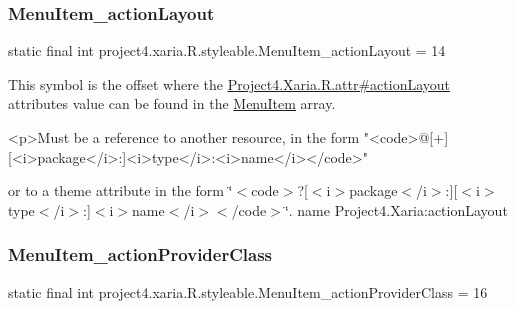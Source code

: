 \mbox{\label{classproject4_1_1xaria_1_1R_1_1styleable_a1915ac7c3d21f624b8be98708d0a6d98}} 
\subsubsection{\texorpdfstring{Menu\+Item\+\_\+action\+Layout}{MenuItem\_actionLayout}}
{\footnotesize\ttfamily static final int project4.\+xaria.\+R.\+styleable.\+Menu\+Item\+\_\+action\+Layout = 14\hspace{0.3cm}{\ttfamily [static]}}

This symbol is the offset where the \hyperlink{}{Project4.\+Xaria.\+R.\+attr\#action\+Layout} attribute\textquotesingle{}s value can be found in the \hyperlink{classproject4_1_1xaria_1_1R_1_1styleable_a8a573827fcaba6497e560662224b5530}{Menu\+Item} array.

\begin{DoxyVerb}      <p>Must be a reference to another resource, in the form "<code>@[+][<i>package</i>:]<i>type</i>:<i>name</i></code>"
\end{DoxyVerb}
 or to a theme attribute in the form \char`\"{}$<$code$>$?\mbox{[}$<$i$>$package$<$/i$>$\+:\mbox{]}\mbox{[}$<$i$>$type$<$/i$>$\+:\mbox{]}$<$i$>$name$<$/i$>$$<$/code$>$\char`\"{}.  name Project4.\+Xaria\+:action\+Layout \mbox{\label{classproject4_1_1xaria_1_1R_1_1styleable_a93fe7ce7481403c9886e9ee5cc2e76b7}} 
\subsubsection{\texorpdfstring{Menu\+Item\+\_\+action\+Provider\+Class}{MenuItem\_actionProviderClass}}
{\footnotesize\ttfamily static final int project4.\+xaria.\+R.\+styleable.\+Menu\+Item\+\_\+action\+Provider\+Class = 16\hspace{0.3cm}{\ttfamily [static]}}

